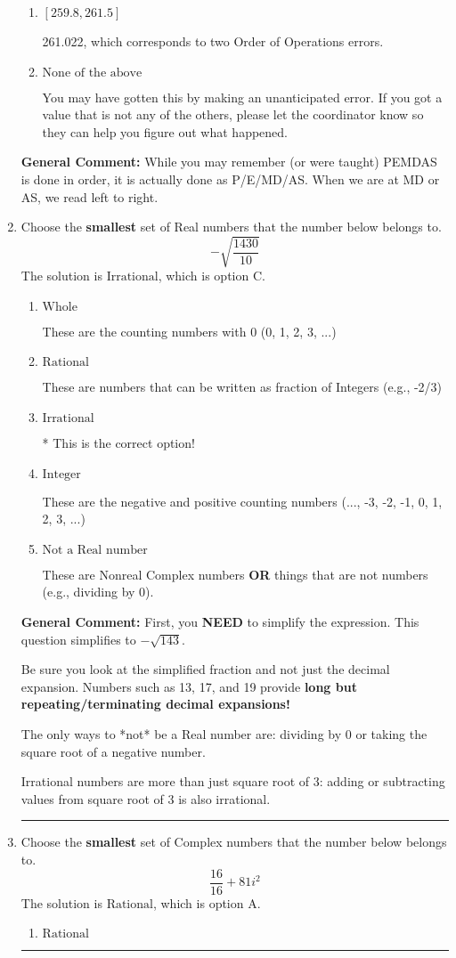 \documentclass{extbook}[14pt]
\newcommand{\litem}[1]{\item #1

\rule{\textwidth}{0.4pt}}
\begin{document}
\begin{enumerate}
{\begin{enumerate}[label=\Alph*.]
* -248.387, this is the correct option
\item \( [259.8, 261.5] \)

 261.022, which corresponds to two Order of Operations errors.
\item \( \text{None of the above} \)

 You may have gotten this by making an unanticipated error. If you got a value that is not any of the others, please let the coordinator know so they can help you figure out what happened.
\end{enumerate}

\textbf{General Comment:} While you may remember (or were taught) PEMDAS is done in order, it is actually done as P/E/MD/AS. When we are at MD or AS, we read left to right.
}
\litem{
Choose the \textbf{smallest} set of Real numbers that the number below belongs to.
\[ -\sqrt{\frac{1430}{10}} \]The solution is \( \text{Irrational} \), which is option C.\begin{enumerate}[label=\Alph*.]
\item \( \text{Whole} \)

These are the counting numbers with 0 (0, 1, 2, 3, ...)
\item \( \text{Rational} \)

These are numbers that can be written as fraction of Integers (e.g., -2/3)
\item \( \text{Irrational} \)

* This is the correct option!
\item \( \text{Integer} \)

These are the negative and positive counting numbers (..., -3, -2, -1, 0, 1, 2, 3, ...)
\item \( \text{Not a Real number} \)

These are Nonreal Complex numbers \textbf{OR} things that are not numbers (e.g., dividing by 0).
\end{enumerate}

\textbf{General Comment:} First, you \textbf{NEED} to simplify the expression. This question simplifies to $-\sqrt{143}$. 
 
 Be sure you look at the simplified fraction and not just the decimal expansion. Numbers such as 13, 17, and 19 provide \textbf{long but repeating/terminating decimal expansions!} 
 
 The only ways to *not* be a Real number are: dividing by 0 or taking the square root of a negative number. 
 
 Irrational numbers are more than just square root of 3: adding or subtracting values from square root of 3 is also irrational.
}
\litem{
Choose the \textbf{smallest} set of Complex numbers that the number below belongs to.
\[ \frac{16}{16}+81i^2 \]The solution is \( \text{Rational} \), which is option A.\begin{enumerate}[label=\Alph*.]
\item \( \text{Rational} \)


\end{enumerate}}
\end{enumerate}
\end{document}
